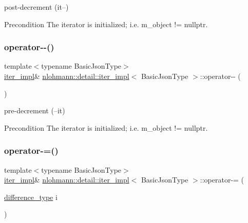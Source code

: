 post-\/decrement (it--) 

\begin{DoxyPrecond}{Precondition}
The iterator is initialized; i.\+e. {\ttfamily m\+\_\+object != nullptr}. 
\end{DoxyPrecond}
\mbox{\label{classnlohmann_1_1detail_1_1iter__impl_a84e689fb581d651d130039f7cb81494a}} 
\subsubsection{\texorpdfstring{operator-\/-\/()}{operator--()}\hspace{0.1cm}{\footnotesize\ttfamily [2/2]}}
{\footnotesize\ttfamily template$<$typename Basic\+Json\+Type$>$ \\
\hyperlink{classnlohmann_1_1detail_1_1iter__impl}{iter\+\_\+impl}\& \hyperlink{classnlohmann_1_1detail_1_1iter__impl}{nlohmann\+::detail\+::iter\+\_\+impl}$<$ Basic\+Json\+Type $>$\+::operator-\/-\/ (\begin{DoxyParamCaption}{ }\end{DoxyParamCaption})\hspace{0.3cm}{\ttfamily [inline]}}



pre-\/decrement (--it) 

\begin{DoxyPrecond}{Precondition}
The iterator is initialized; i.\+e. {\ttfamily m\+\_\+object != nullptr}. 
\end{DoxyPrecond}
\mbox{\label{classnlohmann_1_1detail_1_1iter__impl_abcc9d51bc52f2e8483bbe4018f05e978}} 
\subsubsection{\texorpdfstring{operator-\/=()}{operator-=()}}
{\footnotesize\ttfamily template$<$typename Basic\+Json\+Type$>$ \\
\hyperlink{classnlohmann_1_1detail_1_1iter__impl}{iter\+\_\+impl}\& \hyperlink{classnlohmann_1_1detail_1_1iter__impl}{nlohmann\+::detail\+::iter\+\_\+impl}$<$ Basic\+Json\+Type $>$\+::operator-\/= (\begin{DoxyParamCaption}\item[{\hyperlink{classnlohmann_1_1detail_1_1iter__impl_a2f7ea9f7022850809c60fc3263775840}{difference\+\_\+type}}]{i }\end{DoxyParamCaption})\hspace{0.3cm}{\ttfamily [inline]}}



